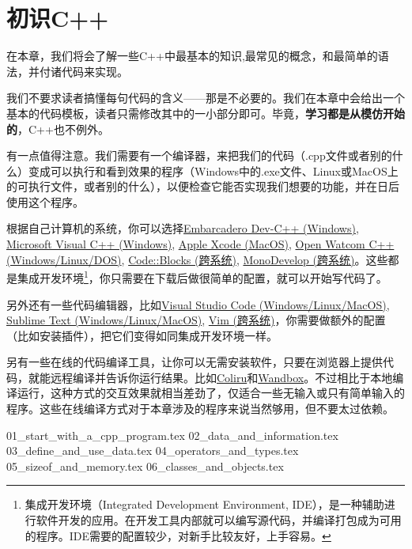 \chapter{初识C++}
在本章，我们将会了解一些C++中最基本的知识,最常见的概念，和最简单的语法，并付诸代码来实现。\par
我们不要求读者搞懂每句代码的含义——那是不必要的。我们在本章中会给出一个基本的代码模板，读者只需修改其中的一小部分即可。毕竟，\textbf{学习都是从模仿开始的}，C++也不例外。\par
有一点值得注意。我们需要有一个编译器，来把我们的代码（.cpp文件或者别的什么）变成可以执行和看到效果的程序（Windows中的.exe文件、Linux或MacOS上的可执行文件，或者别的什么），以便检查它能否实现我们想要的功能，并在日后使用这个程序。\par
根据自己计算机的系统，你可以选择\href{https://www.embarcadero.com/free-tools/dev-cpp}{Embarcadero Dev-C++ (Windows)}, \href{https://learn.microsoft.com/zh-cn/cpp/?view=msvc-170}{Microsoft Visual C++ (Windows)}, \href{https://developer.apple.com/xcode/}{Apple Xcode (MacOS)}, \href{https://github.com/open-watcom/open-watcom-v2}{Open Watcom C++ (Windows/Linux/DOS)}, \href{https://www.codeblocks.org/}{Code::Blocks (跨系统)}, \href{https://www.monodevelop.com/}{MonoDevelop (跨系统)}。这些都是集成开发环境\footnote{集成开发环境（Integrated Development Environment, IDE），是一种辅助进行软件开发的应用。在开发工具内部就可以编写源代码，并编译打包成为可用的程序。IDE需要的配置较少，对新手比较友好，上手容易。}，你只需要在下载后做很简单的配置，就可以开始写代码了。\par
另外还有一些代码编辑器，比如\href{https://code.visualstudio.com/}{Visual Studio Code (Windows/Linux/MacOS)}, \href{https://www.sublimetext.com/}{Sublime Text (Windows/Linux/MacOS)}, \href{https://www.vim.org/}{Vim (跨系统)}，你需要做额外的配置（比如安装插件），把它们变得如同集成开发环境一样。\par
另有一些在线的代码编译工具，让你可以无需安装软件，只要在浏览器上提供代码，就能远程编译并告诉你运行结果。比如\href{https://coliru.stacked-crooked.com/}{Coliru}和\href{https://wandbox.org/}{Wandbox}。不过相比于本地编译运行，这种方式的交互效果就相当差劲了，仅适合一些无输入或只有简单输入的程序。这些在线编译方式对于本章涉及的程序来说当然够用，但不要太过依赖。\par
{01_start_with_a_cpp_program.tex}
{02_data_and_information.tex}
{03_define_and_use_data.tex}
{04_operators_and_types.tex}
{05_sizeof_and_memory.tex}
{06_classes_and_objects.tex}
